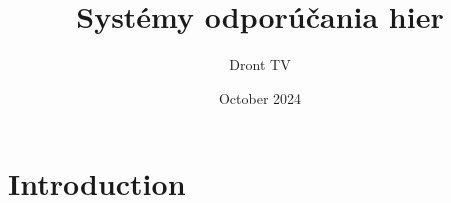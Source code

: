 \documentclass{article}
\title{Systémy odporúčania hier}
\author{Dront TV}
\date{October 2024}
\begin{document}
\maketitle

\section{Introduction}
\end{document}
